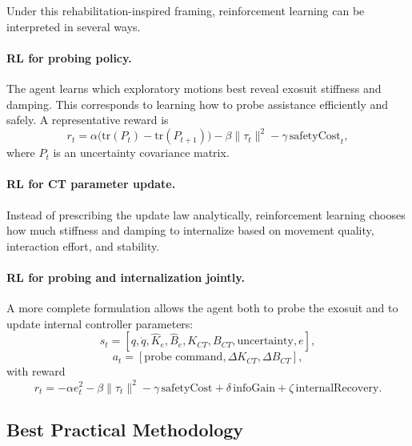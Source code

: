 \documentclass[11pt]{article}
\begin{document}
Under this rehabilitation-inspired framing, reinforcement learning can be interpreted in several ways.

\paragraph{RL for probing policy.}
The agent learns which exploratory motions best reveal exosuit stiffness and damping. This corresponds to learning how to probe assistance efficiently and safely. A representative reward is
\begin{equation}
r_t =
\alpha \bigl(\mathrm{tr}(P_t)-\mathrm{tr}(P_{t+1})\bigr)
-\beta \lVert \tau_t \rVert^2
-\gamma \, \mathrm{safetyCost}_t,
\end{equation}
where \(P_t\) is an uncertainty covariance matrix.

\paragraph{RL for CT parameter update.}
Instead of prescribing the update law analytically, reinforcement learning chooses how much stiffness and damping to internalize based on movement quality, interaction effort, and stability.

\paragraph{RL for probing and internalization jointly.}
A more complete formulation allows the agent both to probe the exosuit and to update internal controller parameters:
\begin{equation}
s_t = [q,\dot{q},\hat{K}_e,\hat{B}_e,K_{CT},B_{CT},\text{uncertainty},e],
\end{equation}
\begin{equation}
a_t = [\text{probe command}, \Delta K_{CT}, \Delta B_{CT}],
\end{equation}
with reward
\begin{equation}
r_t =
-\alpha e_t^2
-\beta \lVert \tau_t \rVert^2
-\gamma \, \mathrm{safetyCost}
+\delta \, \mathrm{infoGain}
+\zeta \, \mathrm{internalRecovery}.
\end{equation}

\subsection{Best Practical Methodology}
\end{document}
